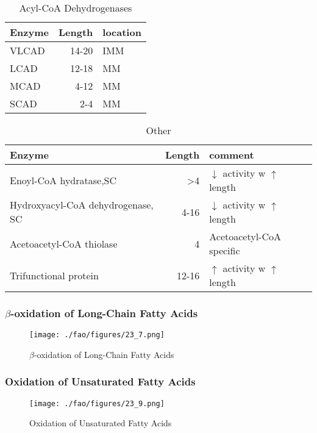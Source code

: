 \documentclass{scrartcl}
\begin{document}
\begin{table}[htbp]
\caption{\label{tab:orgf308992}
Acyl-CoA Dehydrogenases}
\centering
\begin{tabular}{lrl}
Enzyme & Length & location\\
\hline
VLCAD & 14-20 & IMM\\
LCAD & 12-18 & MM\\
MCAD & 4-12 & MM\\
SCAD & 2-4 & MM\\
\end{tabular}
\end{table}


\begin{table}[htbp]
\caption{\label{tab:org4e0f53b}
Other}
\centering
\begin{tabular}{lrl}
Enzyme & Length & comment\\
\hline
Enoyl-CoA hydratase,SC & >4 & \(\downarrow\) activity w \(\uparrow\) length\\
Hydroxyacyl-CoA dehydrogenase, SC & 4-16 & \(\downarrow\) activity w \(\uparrow\) length\\
Acetoacetyl-CoA thiolase & 4 & Acetoacetyl-CoA specific\\
Trifunctional protein & 12-16 & \(\uparrow\) activity w \(\uparrow\) length\\
\end{tabular}
\end{table}


\subsubsection{\(\beta\)-oxidation of Long-Chain Fatty Acids}
\label{sec:orgd83b064}
\begin{figure}[htbp]
\centering
\texttt{[image: ./fao/figures/23\_7.png]}
\caption{\label{fig:org61bc5db}
\(\beta\)-oxidation of Long-Chain Fatty Acids}
\end{figure}

\subsubsection{Oxidation of Unsaturated Fatty Acids}
\label{sec:orga5f0197}

\begin{figure}[htbp]
\centering
\texttt{[image: ./fao/figures/23\_9.png]}
\caption{\label{fig:org5a3bae3}
Oxidation of Unsaturated Fatty Acids}
\end{figure}
\end{document}
